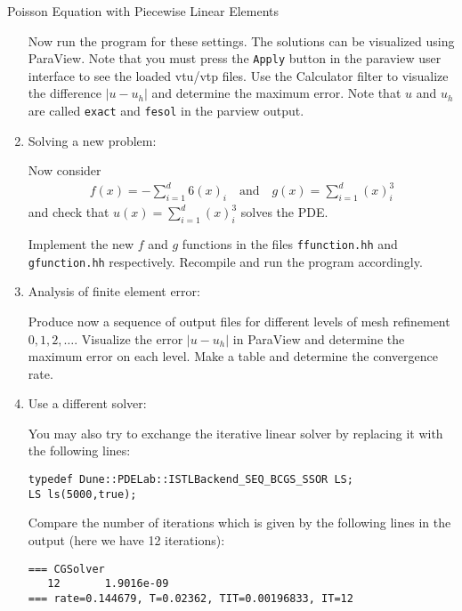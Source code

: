 \documentclass[12pt,a4paper]{article}
\begin{document}
\begin{Exercise}{Poisson Equation with Piecewise Linear Elements}
\begin{enumerate}
  Now run the program for these settings. The solutions can be
  visualized using ParaView.  Note that you must press the
  \lstinline{Apply} button in the paraview user interface to see the
  loaded vtu/vtp files.  Use the Calculator filter to visualize the
  difference $|u-u_h|$ and determine the maximum error. Note that $u$
  and $u_h$ are called \lstinline{exact} and \lstinline{fesol} in
  the parview output.

\item {\sc Solving a new problem}:

  Now consider
  \begin{align}
    f(x) =  -\sum_{i=1}^d 6(x)_i \quad\text{and}\quad  g(x) = \sum_{i=1}^d (x)_i^3
  \end{align}
  and check that $u(x)=\sum_{i=1}^d (x)_i^3$ solves the PDE.

  Implement the new $f$ and $g$ functions in the files
  \lstinline{ffunction.hh} and \lstinline{gfunction.hh}
  respectively. Recompile and run the program accordingly.

\item {\sc Analysis of finite element error}:

  Produce now a sequence of output files for different levels of mesh
  refinement $0, 1, 2, \ldots$. Visualize the error $|u-u_h|$ in
  ParaView and determine the maximum error on each level.  Make a
  table and determine the convergence rate.

\item {\sc Use a different solver}:

You may also try to exchange the iterative linear solver by
replacing it with the following lines:
\begin{lstlisting}
typedef Dune::PDELab::ISTLBackend_SEQ_BCGS_SSOR LS;
LS ls(5000,true);
\end{lstlisting}
Compare the number of iterations which is given by the following lines
in the output (here we have 12 iterations):
\begin{lstlisting}
=== CGSolver
   12       1.9016e-09
=== rate=0.144679, T=0.02362, TIT=0.00196833, IT=12
\end{lstlisting}
\end{enumerate}
\end{Exercise}
\end{document}
